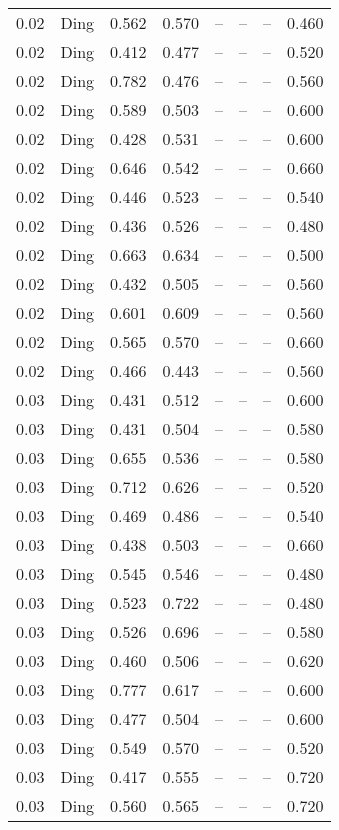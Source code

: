 \begin{table}[H]
\begin{tabular}{l c l l l}
0.02 & Ding & 0.562 & 0.570 & -- & -- & -- & 0.460 \\
0.02 & Ding & 0.412 & 0.477 & -- & -- & -- & 0.520 \\
0.02 & Ding & 0.782 & 0.476 & -- & -- & -- & 0.560 \\
0.02 & Ding & 0.589 & 0.503 & -- & -- & -- & 0.600 \\
0.02 & Ding & 0.428 & 0.531 & -- & -- & -- & 0.600 \\
0.02 & Ding & 0.646 & 0.542 & -- & -- & -- & 0.660 \\
0.02 & Ding & 0.446 & 0.523 & -- & -- & -- & 0.540 \\
0.02 & Ding & 0.436 & 0.526 & -- & -- & -- & 0.480 \\
0.02 & Ding & 0.663 & 0.634 & -- & -- & -- & 0.500 \\
0.02 & Ding & 0.432 & 0.505 & -- & -- & -- & 0.560 \\
0.02 & Ding & 0.601 & 0.609 & -- & -- & -- & 0.560 \\
0.02 & Ding & 0.565 & 0.570 & -- & -- & -- & 0.660 \\
0.02 & Ding & 0.466 & 0.443 & -- & -- & -- & 0.560 \\
0.03 & Ding & 0.431 & 0.512 & -- & -- & -- & 0.600 \\
0.03 & Ding & 0.431 & 0.504 & -- & -- & -- & 0.580 \\
0.03 & Ding & 0.655 & 0.536 & -- & -- & -- & 0.580 \\
0.03 & Ding & 0.712 & 0.626 & -- & -- & -- & 0.520 \\
0.03 & Ding & 0.469 & 0.486 & -- & -- & -- & 0.540 \\
0.03 & Ding & 0.438 & 0.503 & -- & -- & -- & 0.660 \\
0.03 & Ding & 0.545 & 0.546 & -- & -- & -- & 0.480 \\
0.03 & Ding & 0.523 & 0.722 & -- & -- & -- & 0.480 \\
0.03 & Ding & 0.526 & 0.696 & -- & -- & -- & 0.580 \\
0.03 & Ding & 0.460 & 0.506 & -- & -- & -- & 0.620 \\
0.03 & Ding & 0.777 & 0.617 & -- & -- & -- & 0.600 \\
0.03 & Ding & 0.477 & 0.504 & -- & -- & -- & 0.600 \\
0.03 & Ding & 0.549 & 0.570 & -- & -- & -- & 0.520 \\
0.03 & Ding & 0.417 & 0.555 & -- & -- & -- & 0.720 \\
0.03 & Ding & 0.560 & 0.565 & -- & -- & -- & 0.720 \\

\end{tabular}
\end{table}
